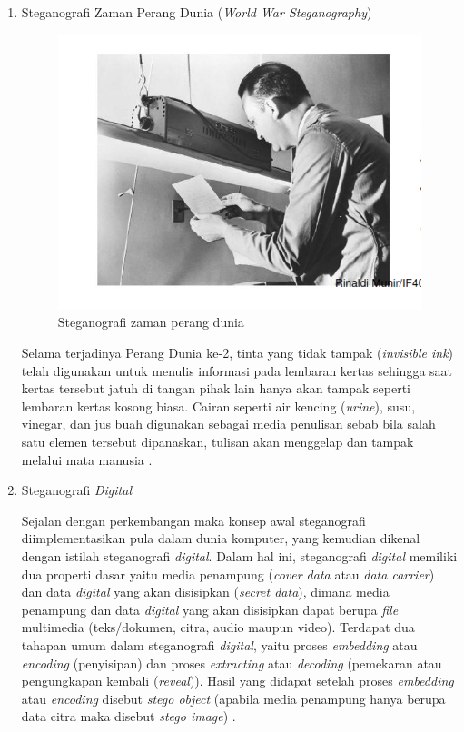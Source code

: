 \begin{enumerate}
		\item Steganografi Zaman Perang Dunia (\emph{World War Steganography})
		
		\begin{figure}[H]
			\centering
			\includegraphics[width=1\textwidth]{gambar/steganografi_perangdunia}
			\caption{Steganografi zaman perang dunia}
			\label{steganografi_perangdunia}
		\end{figure}
	
		Selama terjadinya Perang Dunia ke-2, tinta yang tidak tampak (\emph{invisible ink}) telah digunakan untuk menulis informasi pada lembaran kertas sehingga saat kertas tersebut jatuh di tangan pihak lain hanya akan tampak seperti lembaran kertas kosong biasa. Cairan seperti air kencing (\emph{urine}), susu, vinegar, dan jus buah digunakan sebagai media penulisan sebab bila salah satu elemen tersebut dipanaskan, tulisan akan menggelap dan tampak melalui mata manusia \cite{munir}.
		
		\item Steganografi \emph{Digital}
		
		Sejalan dengan perkembangan maka konsep awal steganografi diimplementasikan pula dalam dunia komputer, yang kemudian dikenal dengan istilah steganografi \emph{digital}. Dalam hal ini, steganografi \emph{digital} memiliki dua properti dasar yaitu media penampung (\emph{cover data} atau \emph{data carrier}) dan data \emph{digital} yang akan disisipkan (\emph{secret data}), dimana media penampung dan data \emph{digital} yang akan disisipkan dapat berupa \emph{file} multimedia (teks/dokumen, citra, audio maupun video). Terdapat dua tahapan umum dalam steganografi \emph{digital}, yaitu proses \emph{embedding} atau \emph{encoding} (penyisipan) dan proses \emph{extracting} atau \emph{decoding} (pemekaran atau pengungkapan kembali (\emph{reveal})). Hasil yang didapat setelah proses \emph{embedding} atau \emph{encoding} disebut \emph{stego object} (apabila media penampung hanya berupa data citra maka disebut \emph{stego image}) \cite{prayudi}.
	\end{enumerate}

